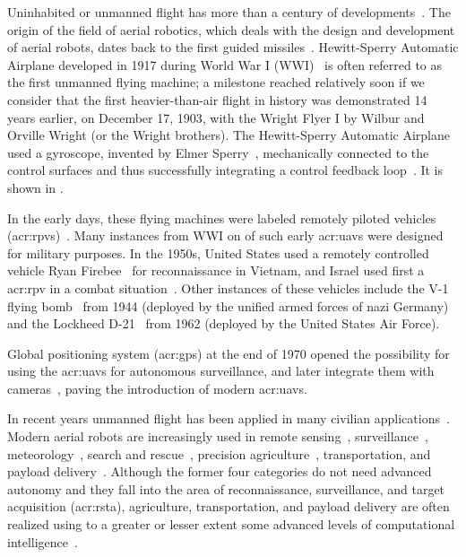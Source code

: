 Uninhabited or unmanned flight has more than a century of developments~\citep{siciliano2016springer}. The origin of the field of aerial robotics, which deals with the design and development of aerial robots, dates back to the first guided missiles~\citep{siciliano2016springer}. Hewitt-Sperry Automatic Airplane developed in 1917 during World War I (WWI)~\citep{keane2013brief,valavanis2015handbook} is often referred to as the first unmanned flying machine; a milestone reached relatively soon if we consider that the first heavier-than-air flight in history was demonstrated 14 years earlier, on December 17, 1903, with the Wright Flyer I by Wilbur and Orville Wright (or the Wright brothers). The Hewitt-Sperry Automatic Airplane used a gyroscope, invented by Elmer Sperry~\citep{keane2013brief}, mechanically connected to the control surfaces and thus successfully integrating a control feedback loop~\citep{siciliano2016springer}. It is shown in .

In the early days, these flying machines were labeled remotely piloted vehicles (\Gls{acr:rpv}s)~\citep{anderson2005introduction}. Many instances from WWI on of such early \Gls{acr:uav}s were designed for military purposes. In the 1950s, United States used a remotely controlled vehicle Ryan Firebee~ for reconnaissance in Vietnam, and Israel used first a \Gls{acr:rpv} in a combat situation~\citep{anderson2005introduction}. Other instances of these vehicles include the V-1 flying bomb~ from 1944 (deployed by the unified armed forces of nazi Germany) and the Lockheed D-21~ from 1962 (deployed by the United States Air Force).

Global positioning system (\Gls{acr:gps}) at the end of 1970 opened the possibility for using the \Gls{acr:uav}s for autonomous surveillance, and later integrate them with cameras~\citep{siciliano2016springer}, paving the introduction of modern \Gls{acr:uav}s.

In recent years unmanned flight has been applied in many civilian applications~\citep{gonzalez2017unmanned}. Modern aerial robots are increasingly used in remote sensing~\citep{noor2018remote,tang2015drone,milas2018drones}, surveillance~\citep{paucar2018use,burkle2009collaborating}, meteorology~\citep{schuyler2019using}, search and rescue~\citep{pensieri2020drones,karaca2018potential,cui2015drones,seguin2018unmanned}, precision agriculture~\citep{daponte2019review,puri2017agriculture}, transportation, and payload delivery~\citep{kellermann2020drones}. Although the former four categories do not need advanced autonomy and they fall into the area of reconnaissance, surveillance, and target acquisition (\Gls{acr:rsta}), agriculture, transportation, and payload delivery are often realized using to a greater or lesser extent some advanced levels of computational intelligence~\citep{siciliano2016springer}. 

